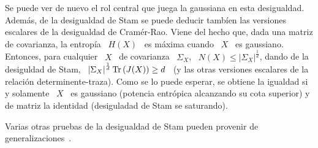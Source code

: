 %
Se  puede  ver  de  nuevo  el  rol  central  que  juega  la  gaussiana  en  esta
desigualdad. Adem\'as, de la desigualdad  de Stam se puede deducir tamb\'ien las
versiones escalares de la desigualdad de Cram\'er-Rao. Viene del hecho que, dada
una matriz de covarianza, la entrop\'ia \ $H(X)$ \ es m\'axima cuando \ $X$ \ es
gaussiano.  Entonces, para cualquier \ $X$ \ de covarianza \ $\Sigma_X$, \ $N(X)
\le  \left| \Sigma_X  \right|^{\frac1d}$,  dando  de la  desiguldad  de Stam,  \
$\left| \Sigma_X \right|^{\frac1d} \operatorname{Tr}\left( J(X)  \right) \ge d$ \ (y las otras
versiones  escalares de  la relaci\'on  determinente-traza).  Como  se  lo puede
esperar, se  obtiene la igualdad si y  solamente \ $X$ \  es gaussiano (potencia
entr\'opica alcanzando su  cota superior) y de matriz  la identidad (desiguladad
de Stam se saturando).

Varias   otras  pruebas   de  la   desigualdad  de   Stam  pueden   provenir  de
generalizaciones~\cite{Ber12:06_1, Ber13, LutYan05, LutLv12, ZozPue17}.
